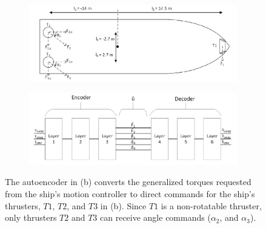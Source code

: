 \documentclass{article}
\begin{document}
\begin{figure}[H]
    \centering
    \begin{subfigure}{0.55\textwidth}
        \includegraphics[width=\textwidth]{./ship.png}
        \caption{}
    \end{subfigure} 
    \begin{subfigure}{0.6\textwidth}
        \includegraphics[width=\textwidth]{./autoencoder.png}
        \caption{}
    \end{subfigure}
    \caption{The autoencoder in (b) converts the generalized torques requested from the ship's motion controller to direct commands for the ship's thrusters, $T1$, $T2$, and $T3$ in (b). Since $T1$ is a non-rotatable thruster, only thrusters $T2$ and $T3$ can receive angle commands ($\alpha_2$, and $\alpha_3$).}
    \label{fig:ship}
\end{figure}
\end{document}
